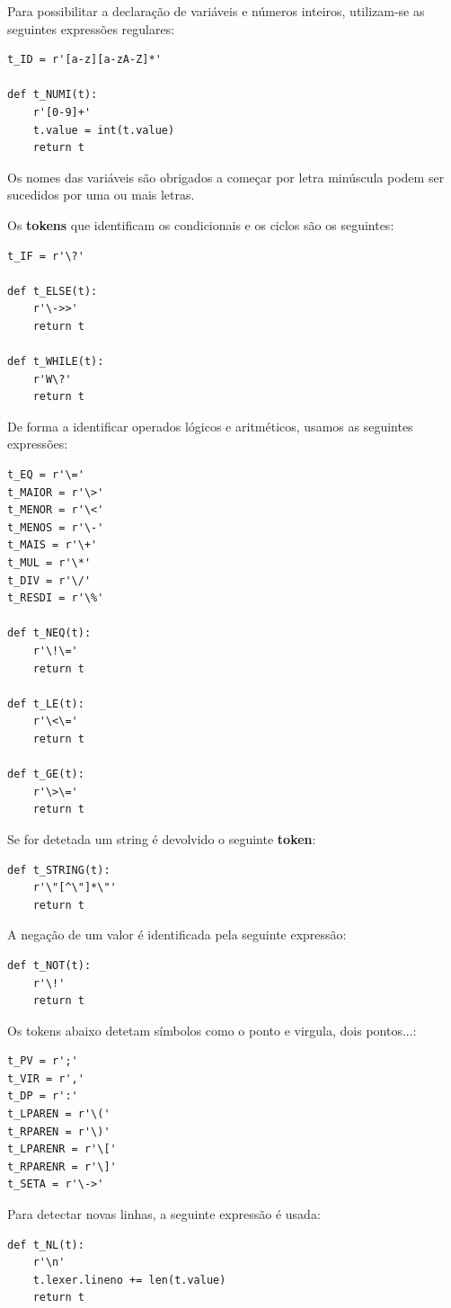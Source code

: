 \documentclass{article}
\begin{document}
Para possibilitar a declaração de variáveis e números inteiros, utilizam-se as seguintes expressões regulares:
\begin{lstlisting}[]
t_ID = r'[a-z][a-zA-Z]*'

def t_NUMI(t):
    r'[0-9]+'
    t.value = int(t.value)
    return t
\end{lstlisting}
Os nomes das variáveis são obrigados a começar por letra minúscula podem ser sucedidos por uma ou mais letras.

\par Os \textbf{tokens} que identificam os condicionais e os ciclos são os seguintes:
\begin{lstlisting}[]
t_IF = r'\?'

def t_ELSE(t):
    r'\->>'
    return t
    
def t_WHILE(t):
    r'W\?'
    return t
\end{lstlisting}

De forma a identificar operados lógicos e aritméticos, usamos as seguintes expressões:
\begin{lstlisting}[]
t_EQ = r'\='
t_MAIOR = r'\>'
t_MENOR = r'\<'
t_MENOS = r'\-'
t_MAIS = r'\+'
t_MUL = r'\*'
t_DIV = r'\/'
t_RESDI = r'\%'

def t_NEQ(t):
    r'\!\='
    return t
    
def t_LE(t):
    r'\<\='
    return t

def t_GE(t):
    r'\>\='
    return t
\end{lstlisting}

Se for detetada um string é devolvido o seguinte \textbf{token}:
\begin{lstlisting}[]
def t_STRING(t):
    r'\"[^\"]*\"'
    return t
\end{lstlisting}

A negação de um valor é identificada pela seguinte expressão:
\begin{lstlisting}[]
def t_NOT(t):
    r'\!'
    return t
\end{lstlisting}

Os tokens abaixo detetam símbolos como o ponto e virgula, dois pontos...:
\begin{lstlisting}[]
t_PV = r';'
t_VIR = r','
t_DP = r':'
t_LPAREN = r'\('
t_RPAREN = r'\)'
t_LPARENR = r'\['
t_RPARENR = r'\]'
t_SETA = r'\->'
\end{lstlisting}

Para detectar novas linhas, a seguinte expressão é usada:
\begin{lstlisting}[]
def t_NL(t):
    r'\n'
    t.lexer.lineno += len(t.value)
    return t
\end{lstlisting}
\end{document}
